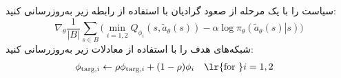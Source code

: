 \begin{algorithm}[H]
\begin{algorithmic}[1]
		\State سیاست را با یک مرحله از صعود گرادیان با استفاده از رابطه زیر به‌روزرسانی کنید:
		\begin{equation*}
			\nabla_{\theta} \frac{1}{|B|}\sum_{s \in B} \Big(\min_{i=1,2} Q_{\phi_i}(s, \tilde{a}_{\theta}(s)) - \alpha \log \pi_{\theta} \left(\left. \tilde{a}_{\theta}(s) \right| s\right) \Big)
		\end{equation*}
		\State شبکه‌های هدف را با استفاده از معادلات زیر به‌روزرسانی کنید:
		\begin{align*}
			\phi_{\text{targ},i} &\leftarrow \rho \phi_{\text{targ}, i} + (1-\rho) \phi_i \quad \text{\lr{for }}i=1,2  
		\end{align*}
		\EndFor
		\EndIf
		\EndWhile
	\end{algorithmic}
\end{algorithm}
